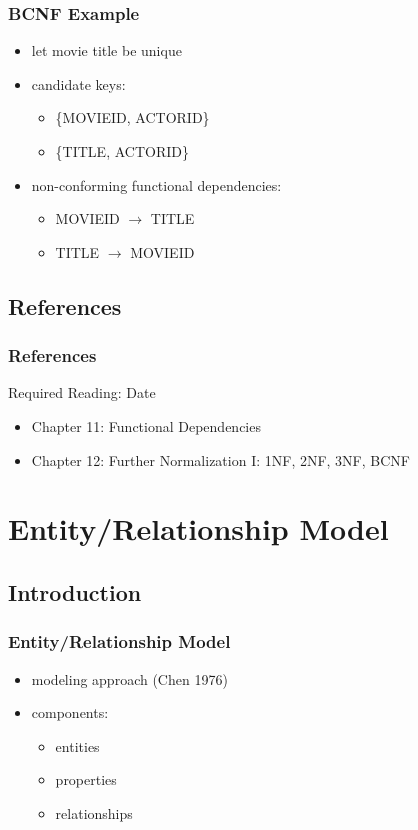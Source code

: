 \documentclass[dvipsnames]{beamer}
\begin{document}
\begin{frame}
  \frametitle{BCNF Example}

  \begin{itemize}
    \item let movie title be unique
    \item candidate keys:
    \begin{itemize}
      \item \{MOVIEID, ACTORID\}
      \item \{TITLE, ACTORID\}
    \end{itemize}

    \pause
    \item non-conforming functional dependencies:
    \begin{itemize}
      \item MOVIEID $\rightarrow$ TITLE
      \item TITLE $\rightarrow$ MOVIEID
    \end{itemize}
  \end{itemize}
\end{frame}

\subsection*{References}

\begin{frame}
  \frametitle{References}

  \begin{block}{Required Reading: Date}
    \begin{itemize}
      \item Chapter 11: \alert{Functional Dependencies}
      \item Chapter 12: \alert{Further Normalization I: 1NF, 2NF, 3NF, BCNF}
    \end{itemize}
  \end{block}
\end{frame}

\section{Entity/Relationship Model}

\subsection{Introduction}

\begin{frame}
  \frametitle{Entity/Relationship Model}

  \begin{itemize}
    \item modeling approach (Chen 1976)

    \medskip
    \item components:
    \begin{itemize}
      \item entities
      \item properties
      \item relationships
    \end{itemize}
  \end{itemize}
\end{frame}
\end{document}
